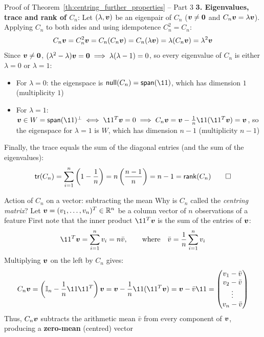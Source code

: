 \documentclass[aspectratio=169]{beamer}\usepackage[]{graphicx}\usepackage[]{xcolor}
\begin{document}
\begin{frame}{Proof of Theorem~\ref{th:centring_further_properties} -- Part 3}
\textbf{3. Eigenvalues, trace and rank of $C_n$}:
\vfill
Let $(\lambda,\bm{v})$ be an eigenpair of $C_n$ ($\bv\neq\b0$ and $C_n\bm{v} = \lambda\bm{v}$). Applying $C_n$ to both sides and using idempotence $C_n^2 = C_n$:
\[
C_n\bm{v} = C_n^2\bm{v} = C_n(C_n\bm{v}) = C_n(\lambda\bm{v}) = \lambda(C_n\bm{v}) = \lambda^2\bm{v}
\]
Since $\bv\neq\b0$, $(\lambda^2 - \lambda)\bv = \b0 \implies \lambda(\lambda - 1) = 0$, so every eigenvalue of $C_n$ is either $\lambda = 0$ or $\lambda = 1$:
\begin{itemize}
\item For $\lambda = 0$: the eigenspace is $\nullspace(C_n) = \Span(\11)$, which has dimension $1$ (multiplicity $1$)
\item For $\lambda = 1$: $\bv\in W = \Span(\11)^\perp \iff \11^T\bv = 0 \implies C_n\bv = \bv - \frac{1}{n}\11(\11^T\bv) = \bv$, so the eigenspace for $\lambda = 1$ is $W$, which has dimension $n - 1$ (multiplicity $n-1$)
\end{itemize}
\vfill
Finally, the trace equals the sum of the diagonal entries (and the sum of the eigenvalues):
\[
\tr(C_n) = \sum_{i=1}^n \left(1 - \frac{1}{n}\right) = n\left(\frac{n-1}{n}\right) = n - 1 = \rank(C_n) \hfill\qed
\]
\end{frame}

\begin{frame}{Action of $C_n$ on a vector: subtracting the mean}
Why is $C_n$ called the \emph{centring matrix}? Let $\bm{v} = (v_1,\ldots,v_n)^T\in\mathbb{R}^n$ be a column vector of $n$ observations of a feature
\vfill
First note that the inner product $\11^T\bv$ is the sum of the entries of $\bm{v}$:
\[
\11^T\bv = \sum_{i=1}^n v_i = n\bar{v}, \qquad\text{where}\quad \bar{v} = \frac{1}{n}\sum_{i=1}^n v_i
\]
\vfill
Multiplying $\bm{v}$ on the left by $C_n$ gives:
\[
C_n\bv = \left(\II_n - \frac{1}{n}\11\11^T\right)\bv = \bv - \frac{1}{n}\11(\11^T\bv) = \bv - \bar{v}\11 = \begin{pmatrix} v_1 - \bar{v} \\ v_2 - \bar{v} \\ \vdots \\ v_n - \bar{v} \end{pmatrix}
\]
\vfill
Thus, $C_n\bm{v}$ subtracts the arithmetic mean $\bar{v}$ from every component of $\bm{v}$, producing a \textbf{zero-mean} (centred) vector
\end{frame}
\end{document}
